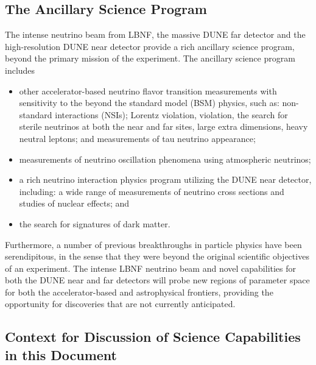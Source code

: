 \subsection{The Ancillary Science Program}

The intense neutrino beam from LBNF, the massive DUNE \lartpc far detector and the high-resolution
  DUNE near detector provide a rich ancillary science program, beyond the primary mission of the experiment. The ancillary science program includes
\begin{itemize}
     \item other accelerator-based neutrino flavor transition measurements with sensitivity to the beyond the standard model (BSM) physics, such as: non-standard interactions (NSIs); Lorentz violation,   violation, the search for sterile neutrinos at both the near and far sites, large extra dimensions, heavy neutral leptons;
 and measurements of tau neutrino appearance;
     \item measurements of neutrino oscillation phenomena using atmospheric neutrinos;
     \item a rich neutrino interaction physics program utilizing the DUNE near detector, including: a wide range of measurements of neutrino cross sections and studies of nuclear effects; and
     \item  the search for signatures of dark matter.
\end{itemize} 

Furthermore, a number of previous breakthroughs in particle physics have been serendipitous, in the sense that they were beyond the
original scientific objectives of an experiment. The intense LBNF neutrino beam and novel capabilities for both 
the DUNE near and far detectors will probe new regions of parameter space for both the accelerator-based and astrophysical frontiers, 
providing the opportunity for discoveries that are not currently anticipated.

\subsection{Context for Discussion of Science Capabilities in this Document}


